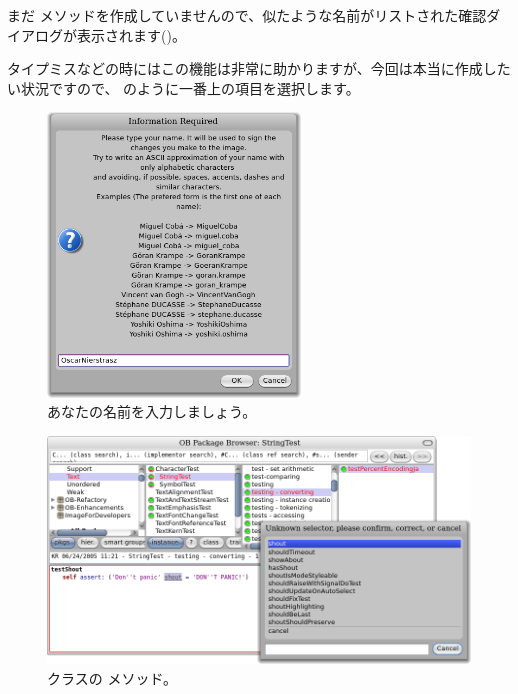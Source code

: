 \documentclass[a4paper,10pt,twoside]{book}
\begin{document}
{{{まだ  メソッドを作成していませんので、似たような名前がリストされた確認ダイアログが表示されます()。

タイプミスなどの時にはこの機能は非常に助かりますが、今回は本当に作成したい状況ですので、 のように一番上の項目を選択します。


\begin{figure}[htb]
\centerline {\includegraphics[width=0.6\textwidth]{name}}
\caption{あなたの名前を入力しましょう。}
\end{figure}

\begin{figure}[htb]
\centerline {\includegraphics[width=\textwidth]{testShoutConfirm}}
\caption{ クラスの  メソッド。}
\end{figure}


}}}
\end{document}
